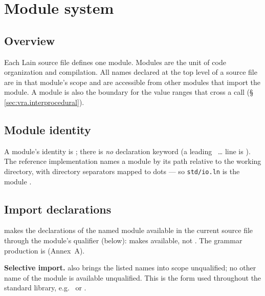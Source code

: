 \chapter{Module system}
\label{sec:16-modules}

\section{Overview}
\label{sec:mod.overview}

\pnum
Each Lain source file defines one module.  Modules are the unit of code
organization and compilation.  All names declared at the top level of a
source file are in that module's scope and are accessible from other
modules that import the module.  A module is also the boundary for the value
ranges that cross a call (\S\,\ref{sec:vra.interprocedural}).

\section{Module identity}
\label{sec:mod.declaration}

\pnum
A module's identity is ; there is \emph{no}  declaration keyword (a
leading ~\dots{} line is ).  The reference
implementation names a module by its path relative to the working directory,
with directory separators mapped to dots --- so \texttt{std/io.ln} is the
module .

\section{Import declarations}
\label{sec:mod.import}

\pnum
{} makes the declarations of the named module
available in the current source file through the module's qualifier
(below):  makes  available, not
.  The grammar production is 
(Annex~A).

\pnum
\textbf{Selective import.}  
also brings the listed names into scope unqualified; no other name of the
module is available unqualified.  This is the form used throughout the
standard library, e.g.\
 or
.


